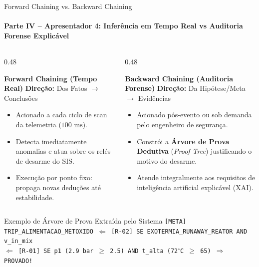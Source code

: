 \documentclass[aspectratio=169, 10pt]{beamer}
\begin{document}
\begin{frame}{Forward Chaining vs. Backward Chaining}
  \framesubtitle{Parte IV -- Apresentador 4: Inferência em Tempo Real vs Auditoria Forense Explicável}
  \begin{columns}[t]
    \begin{column}{0.48\textwidth}
      \begin{block}{\textbf{Forward Chaining (Tempo Real)}}
        \textbf{Direção:} Dos Fatos $\to$ Conclusões
        \begin{itemize}
          \item Acionado a cada ciclo de scan da telemetria ($100\text{ ms}$).
          \item Detecta imediatamente anomalias e atua sobre os relés de desarme do SIS.
          \item Execução por ponto fixo: propaga novas deduções até estabilidade.
        \end{itemize}
      \end{block}
    \end{column}

    \begin{column}{0.48\textwidth}
      \begin{block}{\textbf{Backward Chaining (Auditoria Forense)}}
        \textbf{Direção:} Da Hipótese/Meta $\to$ Evidências
        \begin{itemize}
          \item Acionado pós-evento ou sob demanda pelo engenheiro de segurança.
          \item Constrói a \textbf{Árvore de Prova Dedutiva} (\textit{Proof Tree}) justificando o motivo do desarme.
          \item Atende integralmente aos requisitos de inteligência artificial explicável (XAI).
        \end{itemize}
      \end{block}
    \end{column}
  \end{columns}

  \vspace{0.3cm}
  \begin{exampleblock}{Exemplo de Árvore de Prova Extraída pelo Sistema}
    \texttt{[META] TRIP\_ALIMENTACAO\_METOXIDO $\Leftarrow$ [R-02] SE EXOTERMIA\_RUNAWAY\_REATOR AND v\_in\_mix}\\
    \texttt{\quad $\Leftarrow$ [R-01] SE p1 (2.9 bar $\ge$ 2.5) AND t\_alta (72$^\circ$C $\ge$ 65) $\Rightarrow$ PROVADO!}
  \end{exampleblock}
\end{frame}
\end{document}
